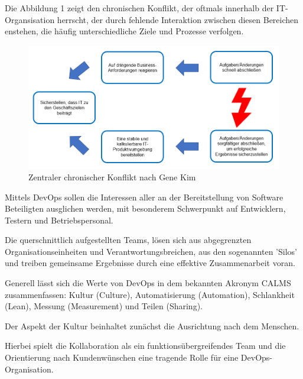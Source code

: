 Die Abbildung 1 zeigt den chronischen Konflikt, der oftmals innerhalb der IT-Organsisation herrscht, der durch fehlende Interaktion zwischen diesen Bereichen enstehen, die häufig unterschiedliche Ziele und Prozesse verfolgen. \cite[S. 349 - 350]{kim_devops-handbuch_2017}

\begin{figure}[h]
    \centering
    \includegraphics[scale=0.6]{Bilder/Core Conflict Clouds}
    \caption{Zentraler chronischer Konflikt nach Gene Kim \cite[S. 349]{kim_devops-handbuch_2017}}
\end{figure}

Mittels DevOps sollen die Interessen aller an der Bereitstellung von Software Beteiligten ausglichen werden, mit besonderem Schwerpunkt auf Entwicklern, Testern und Betriebspersonal. \cite{humble_why_2011}

Die querschnittlich aufgestellten Teams, lösen sich aus abgegrenzten Organisationseinheiten und Verantwortungsbreichen, aus den sogenannten 'Silos' und treiben gemeinsame Ergebnisse durch eine effektive Zusammenarbeit voran. \cite[S.5]{halstenberg_devops_2020} \cite{sollner_devops_2017}

Generell lässt sich die Werte von DevOps in dem bekannten Akronym CALMS zusammenfassen: Kultur (Culture), Automatisierung (Automation), Schlankheit (Lean), Messung (Measurement) und Teilen (Sharing). 

Der Aspekt der Kultur beinhaltet zunächst die Ausrichtung nach dem Menschen.

Hierbei spielt die Kollaboration als ein funktionsübergreifendes Team und die Orientierung nach Kundenwünschen eine tragende Rolle für eine DevOps-Organisation. \cite[S.5]{halstenberg_devops_2020} 

